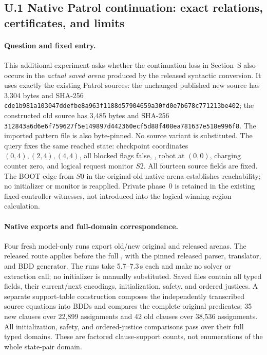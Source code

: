 \subsection*{U.1 Native Patrol continuation: exact relations, certificates, and limits}
\label{supp:native-patrol-continuation}

\paragraph{Question and fixed entry.}
This additional experiment asks whether the continuation loss in
Section~S also occurs in the \emph{actual saved arena} produced by the
released syntactic conversion. It uses exactly the existing Patrol
sources: the unchanged published new source has 3,304 bytes and SHA-256
\nolinkurl{cde1b981a103047ddefbe8a963f1188d57904659a30fd0e7b678c771213be402};
the constructed old source has 3,485 bytes and SHA-256
\nolinkurl{312843a6d6e6f759627f5e149897d442360ecf5d88f408ea781637e518e996f8}.
The imported pattern file is also byte-pinned. No source variant is
substituted. The query fixes the same reached state: checkpoint coordinates
$(0,4),(2,4),(4,4)$, all blocked flags false, ,
robot at $(0,0)$, charging counter zero, and logical request monitor $S2$.
All fourteen source fields are fixed. The BOOT edge from $S0$ in the
original-old native arena establishes reachability; no initializer or
monitor is reapplied.
Private phase~0 is retained in the existing fixed-controller witnesses,
not introduced into the logical winning-region calculation.

\paragraph{Native exports and full-domain correspondence.}
Four fresh model-only runs export old/new original and released arenas.
The released route applies  before the
full , with the pinned released parser,
translator, and BDD generator. The runs take 5.7--7.3\,s each and make no
solver or extraction call; no initializer is manually substituted. Saved files contain
all typed fields, their current/next encodings, initialization, safety,
and ordered justices. A separate support-table construction composes the
independently transcribed source equations into BDDs and compares the
complete original predicates: 35 new clauses over 22,899 assignments and
42 old clauses over 38,536 assignments. All initialization, safety, and
ordered-justice comparisons pass over their full typed domains.
These are factored clause-support counts, not enumerations of the whole
state-pair domain.

